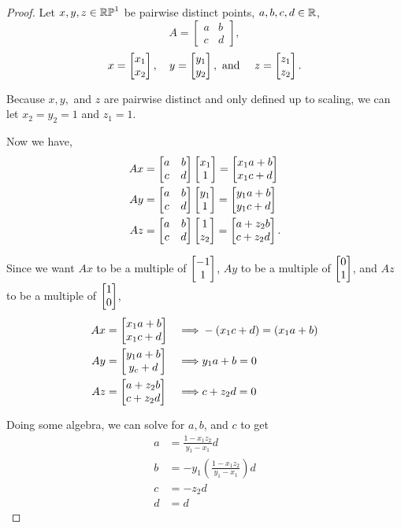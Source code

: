 \documentclass{amsart}
\begin{document}
	\begin{proof}
		Let $x,y,z \in \mathbb{RP}^1$ be pairwise distinct points, $a,b,c,d \in \mathbb{R}$,
		\begin{equation*}
			A = 
			\begin{bmatrix}
				a & b \\
				c & d
			\end{bmatrix},
		\end{equation*}
		\begin{equation*}
			x = \begin{bmatrix} x_1 \\ x_2 \end{bmatrix},\quad y = \begin{bmatrix} y_1 \\ y_2 \end{bmatrix},\text{ and }\quad z = \begin{bmatrix} z_1 \\ z_2 \end{bmatrix}.
		\end{equation*}
		
		Because $x,y,$ and $z$ are pairwise distinct and only defined up to scaling, we can let $x_2 = y_2 = 1$ and $z_1 = 1$.
		
		Now we have,
		\begin{align*}
			Ax &= 
			\begin{bmatrix}
				a & b \\
				c & d
			\end{bmatrix} 
			\begin{bmatrix} x_1 \\ 1 \end{bmatrix}
			= \begin{bmatrix} x_1a + b \\ x_1c + d \end{bmatrix} \\
			Ay &=
			\begin{bmatrix}
				a & b \\
				c & d
			\end{bmatrix}
			\begin{bmatrix} y_1 \\ 1 \end{bmatrix}
			= \begin{bmatrix} y_1a + b \\ y_1c + d \end{bmatrix} \\
			Az &=
			\begin{bmatrix}
				a & b \\
				c & d
			\end{bmatrix}
			\begin{bmatrix} 1 \\ z_2 \end{bmatrix}
			= \begin{bmatrix} a + z_2b \\ c + z_2d \end{bmatrix}.
		\end{align*}
		
		Since we want $Ax$ to be a multiple of $\begin{bmatrix} -1 \\ 1 \end{bmatrix}$, $Ay$ to be a multiple of $\begin{bmatrix} 0 \\ 1 \end{bmatrix}$, and $Az$ to be a multiple of $\begin{bmatrix} 1 \\ 0 \end{bmatrix}$,
		\begin{align*}
			Ax &= \begin{bmatrix} x_1a + b \\ x_1c + d \end{bmatrix} &\implies& -(x_1c + d) = (x_1a + b) \\
			Ay &= \begin{bmatrix} y_1a + b \\ y_c + d \end{bmatrix} &\implies& y_1a + b = 0 \\
			Az &= \begin{bmatrix} a + z_2b \\ c + z_2d \end{bmatrix} &\implies& c + z_2d = 0
		\end{align*}
		
		Doing some algebra, we can solve for $a,b$, and $c$ to get
		\begin{align*}
			a &= \frac{1 - x_1z_2}{y_1 - x_1}d \\
			b &= -y_1 \left( \frac{1 - x_1z_2}{y_1 - x_1}\right) d \\
			c &= -z_2 d \\
			d &= d
		\end{align*}		
		

\end{proof}
\end{document}
